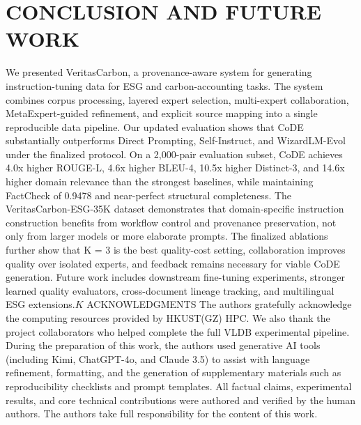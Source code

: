 \documentclass[9pt,twocolumn]{extarticle}
\begin{document}
\section{CONCLUSION AND FUTURE WORK}
We presented VeritasCarbon, a provenance-aware system for generating
instruction-tuning data for ESG and carbon-accounting tasks. The system
combines corpus processing, layered expert selection, multi-expert
collaboration, MetaExpert-guided refinement, and explicit source mapping
into a single reproducible data pipeline.
Our updated evaluation shows that CoDE substantially outperforms Direct
Prompting, Self-Instruct, and WizardLM-Evol under the finalized
protocol. On a 2,000-pair evaluation subset, CoDE achieves 4.0x higher
ROUGE-L, 4.6x higher BLEU-4, 10.5x higher Distinct-3, and 14.6x higher
domain relevance than the strongest baselines, while maintaining
FactCheck of 0.9478 and near-perfect structural completeness.
The VeritasCarbon-ESG-35K dataset demonstrates that domain-specific
instruction construction benefits from workflow control and provenance
preservation, not only from larger models or more elaborate prompts. The
finalized ablations further show that K = 3 is the best quality-cost
setting, collaboration improves quality over isolated experts, and
feedback remains necessary for viable CoDE generation. Future work
includes downstream fine-tuning experiments, stronger learned quality
evaluators, cross-document lineage tracking, and multilingual ESG
extensions.\(K\)
ACKNOWLEDGMENTS
The authors gratefully acknowledge the computing resources provided by
HKUST(GZ) HPC. We also thank the project collaborators who helped
complete the full VLDB experimental pipeline.
During the preparation of this work, the authors used generative AI
tools (including Kimi, ChatGPT-4o, and Claude 3.5) to assist with
language refinement, formatting, and the generation of supplementary
materials such as reproducibility checklists and prompt templates. All
factual claims, experimental results, and core technical contributions
were authored and verified by the human authors. The authors take full
responsibility for the content of this work.
\end{document}
